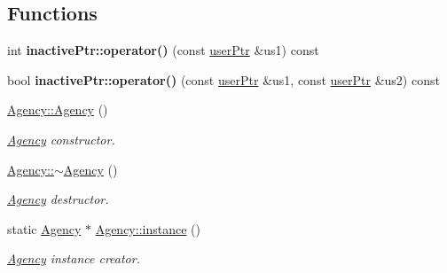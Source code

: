 \subsection*{Functions}
\begin{DoxyCompactItemize}
\item 
\mbox{\label{group___agency_ga165eb4b729955163f0c52852aa554af1}} 
int {\bfseries inactive\+Ptr\+::operator()} (const \hyperlink{structuser_ptr}{user\+Ptr} \&us1) const
\item 
\mbox{\label{group___agency_gadc40c7d895103613550bb1c415f849f0}} 
bool {\bfseries inactive\+Ptr\+::operator()} (const \hyperlink{structuser_ptr}{user\+Ptr} \&us1, const \hyperlink{structuser_ptr}{user\+Ptr} \&us2) const
\item 
\mbox{\label{group___agency_gaf6fc6c4dec00025fce567183f67edbaa}} 
\hyperlink{group___agency_gaf6fc6c4dec00025fce567183f67edbaa}{Agency\+::\+Agency} ()
\begin{DoxyCompactList}\small\item\em \hyperlink{class_agency}{Agency} constructor. \end{DoxyCompactList}\item 
\mbox{\label{group___agency_ga922750a7051987df9bb697769fdf0256}} 
\hyperlink{group___agency_ga922750a7051987df9bb697769fdf0256}{Agency\+::$\sim$\+Agency} ()
\begin{DoxyCompactList}\small\item\em \hyperlink{class_agency}{Agency} destructor. \end{DoxyCompactList}\item 
static \hyperlink{class_agency}{Agency} $\ast$ \hyperlink{group___agency_ga573fab41076b962289fad1f14031b68c}{Agency\+::instance} ()
\begin{DoxyCompactList}\small\item\em \hyperlink{class_agency}{Agency} instance creator. \end{DoxyCompactList}\end{DoxyCompactItemize}
